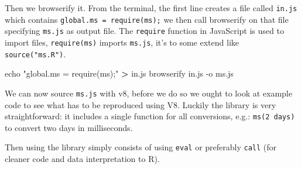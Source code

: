 \documentclass[
  10pt,
]{krantz}
\makeatletter
\newenvironment{Shaded}{\begin{snugshade}}{\end{snugshade}}
\newcommand{\BuiltInTok}[1]{#1}
\newcommand{\CommentTok}[1]{\textcolor[rgb]{0.37,0.37,0.37}{\textit{#1}}}
\newcommand{\ExtensionTok}[1]{#1}
\newcommand{\KeywordTok}[1]{\textcolor[rgb]{0.27,0.27,0.27}{\textbf{#1}}}
\newcommand{\NormalTok}[1]{#1}
\newcommand{\OperatorTok}[1]{\textcolor[rgb]{0.43,0.43,0.43}{\textbf{#1}}}
\newcommand{\StringTok}[1]{\textcolor[rgb]{0.5,0.5,0.5}{#1}}
\newenvironment{kframe}{%
\medskip{}
\setlength{\fboxsep}{.8em}
 \def\at@end@of@kframe{}%
 \ifinner\ifhmode%
  \def\at@end@of@kframe{\end{minipage}}%
  \begin{minipage}{\columnwidth}%
 \fi\fi%
 \def\FrameCommand##1{\hskip\@totalleftmargin \hskip-\fboxsep
 \colorbox{shadecolor}{##1}\hskip-\fboxsep
     \hskip-\linewidth \hskip-\@totalleftmargin \hskip\columnwidth}%
 \MakeFramed {\advance\hsize-\width
   \@totalleftmargin\z@ \linewidth\hsize
   \@setminipage}}%
 {\par\unskip\endMakeFramed%
 \at@end@of@kframe}
\renewenvironment{Shaded}{\begin{kframe}}{\end{kframe}}
\makeatother
\begin{document}
Then we browserify it. From the terminal, the first line creates a file called \texttt{in.js} which contains \texttt{global.ms\ =\ require(\textquotesingle{}ms\textquotesingle{});} we then call browserify on that file specifying \texttt{ms.js} as output file. The \texttt{require} function in JavaScript is used to import files, \texttt{require(\textquotesingle{}ms\textquotesingle{})} imports \texttt{ms.js}, it's to some extend like \texttt{source("ms.R")}.

\begin{Shaded}
\begin{Highlighting}[]
\BuiltInTok{echo} \StringTok{"global.ms = require(\textquotesingle{}ms\textquotesingle{});"} \OperatorTok{>}\NormalTok{ in.js}
\ExtensionTok{browserify}\NormalTok{ in.js {-}o ms.js}
\end{Highlighting}
\end{Shaded}

We can now source \texttt{ms.js} with v8, before we do so we ought to look at example code to see what has to be reproduced using V8. Luckily the library is very straightforward: it includes a single function for all conversions, e.g.: \texttt{ms(\textquotesingle{}2\ days\textquotesingle{})} to convert two days in milliseconds.

\begin{Shaded}
\end{Shaded}

Then using the library simply consists of using \texttt{eval} or preferably \texttt{call} (for cleaner code and data interpretation to R).

\begin{Shaded}
\end{Shaded}
\end{document}
